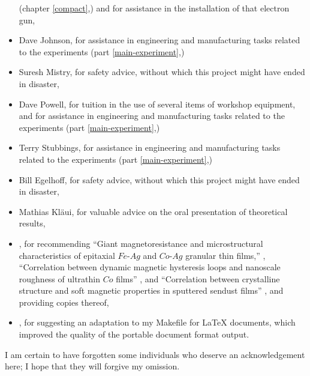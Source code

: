 \begin{itemize}
  (chapter \ref{compact},) and for assistance in the installation of
  that electron gun,
\item{}Dave Johnson, for assistance in engineering and manufacturing
  tasks related to the experiments (part \ref{main-experiment},)
\item{}Suresh Mistry, for safety advice, without which this project
  might have ended in disaster,
\item{}Dave Powell, for tuition in the use of several items of
  workshop equipment, and for assistance in engineering and
  manufacturing tasks related to the experiments (part
  \ref{main-experiment},)
\item{}Terry Stubbings, for assistance in engineering and
  manufacturing tasks related to the experiments (part
  \ref{main-experiment},)
\item{}Bill Egelhoff, for safety advice, without which this project
  might have ended in disaster,
\item{}Mathias Kl\"aui, for valuable advice on the oral presentation
  of theoretical results,
\item {},
  for recommending ``Giant magnetoresistance and microstructural
  characteristics of epitaxial $Fe$-$Ag$ and $Co$-$Ag$ granular thin
  films,'' \cite{Thangaraj:1994:GMM}, ``Correlation between dynamic
  magnetic hysteresis loops and nanoscale roughness of ultrathin $Co$
  films'' \cite{Jiang:1996:CDM}, and ``Correlation between crystalline
  structure and soft magnetic properties in sputtered sendust films''
  \cite{Dodd:1997:CCS}, and providing copies thereof,
\item{}, for
    suggesting an adaptation to my Makefile for \LaTeX{} documents,
    which improved the quality of the portable document format output.
\end{itemize}

I am certain to have forgotten some individuals who deserve an
acknowledgement here; I hope that they will forgive my omission.

